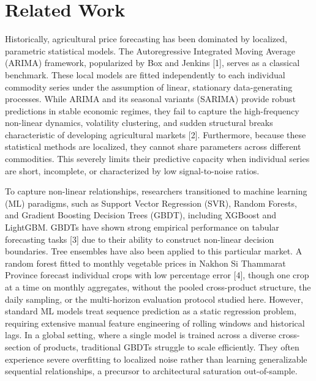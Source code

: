 \documentclass[review,3p,times]{elsarticle}
\begin{document}
\section{Related Work}

Historically, agricultural price forecasting has been dominated by localized, parametric statistical models. The Autoregressive Integrated Moving Average (ARIMA) framework, popularized by Box and Jenkins [1], serves as a classical benchmark. These local models are fitted independently to each individual commodity series under the assumption of linear, stationary data-generating processes. While ARIMA and its seasonal variants (SARIMA) provide robust predictions in stable economic regimes, they fail to capture the high-frequency non-linear dynamics, volatility clustering, and sudden structural breaks characteristic of developing agricultural markets [2]. Furthermore, because these statistical methods are localized, they cannot share parameters across different commodities. This severely limits their predictive capacity when individual series are short, incomplete, or characterized by low signal-to-noise ratios.

To capture non-linear relationships, researchers transitioned to machine learning (ML) paradigms, such as Support Vector Regression (SVR), Random Forests, and Gradient Boosting Decision Trees (GBDT), including XGBoost and LightGBM. GBDTs have shown strong empirical performance on tabular forecasting tasks [3] due to their ability to construct non-linear decision boundaries. Tree ensembles have also been applied to this particular market. A random forest fitted to monthly vegetable prices in Nakhon Si Thammarat Province forecast individual crops with low percentage error [4], though one crop at a time on monthly aggregates, without the pooled cross-product structure, the daily sampling, or the multi-horizon evaluation protocol studied here. However, standard ML models treat sequence prediction as a static regression problem, requiring extensive manual feature engineering of rolling windows and historical lags. In a global setting, where a single model is trained across a diverse cross-section of products, traditional GBDTs struggle to scale efficiently. They often experience severe overfitting to localized noise rather than learning generalizable sequential relationships, a precursor to architectural saturation out-of-sample.
\end{document}
